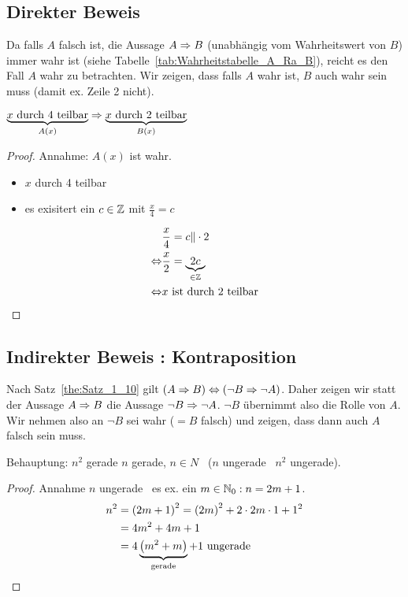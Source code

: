 \subsection{Direkter Beweis}
Da falls $A$ falsch ist, die Aussage $A \Rightarrow B$ (unabhängig vom Wahrheitswert von $B$) immer wahr ist (siehe Tabelle~\vref{tab:Wahrheitstabelle_A_Ra_B}), reicht es den Fall $A$ wahr zu betrachten. Wir zeigen, dass falls $A$ wahr ist, $B$ auch wahr sein muss (damit \ac{ex.} Zeile 2 nicht).

\begin{example}
$\underbrace{x \text{ durch } 4 \text{ teilbar}}_{A(x)} \Rightarrow \underbrace{x \text{ durch } 2 \text{ teilbar}}_{B(x)}$
\end{example}

\begin{proof}
Annahme: $A(x)$ ist wahr.
\begin{itemize}[label=$\Lra$]
\item $x$ durch 4 teilbar
\item es exisitert ein $c \in \mathbb{Z}$ mit $\frac{x}{4} = c$
\end{itemize}

\begin{align*}
&\frac{x}{4} = c \Vert \cdot 2\\
\Leftrightarrow &\frac{x}{2} = \underbrace{2c}_{\in \mathbb{Z}}\\
\Leftrightarrow &x \text{ ist durch 2 teilbar}
\end{align*}
\end{proof}

\subsection{\texorpdfstring{Indirekter Beweis : Kontraposition}{Indirekter Beweis I: Kontraposition}}
Nach Satz~\vref{the:Satz_1_10} gilt $\left(A \Rightarrow B\right) \Leftrightarrow \left(\neg B \Rightarrow \neg A\right)$. Daher zeigen wir statt der Aussage $A \Rightarrow B$ die Aussage $\neg B \Rightarrow \neg A$. $\neg B$ übernimmt also die Rolle von $A$. Wir nehmen also an $\neg B$ sei wahr ($= B$ falsch) und zeigen, dass dann auch $A$ falsch sein muss.

\begin{example}
Behauptung: $n^2$ gerade \Ra $n$ gerade, $n \in N$ \Lra\ ($n$ ungerade \Ra\ $n^2$ ungerade).
\end{example}

\begin{proof}
Annahme $n$ ungerade \Lra\ es \ac{ex.} ein $m \in \mathbb{N}_0 : n = 2m + 1$.
\begin{align*}
n^2 &= \left(2m + 1\right)^2 = \left(2m\right)^2 + 2 \cdot 2m \cdot 1 + 1^2\\
&= 4m^2 + 4m + 1\\
&= 4 \underbrace{\left(m^2 + m\right)}_{\text{gerade}} + 1 \text{ ungerade}
\end{align*}
\end{proof}

